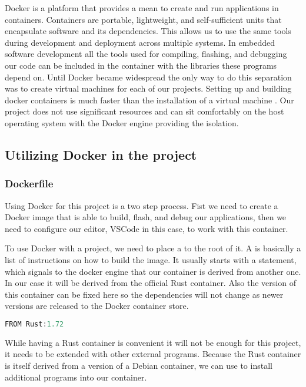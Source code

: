 Docker is a platform that provides a mean to create and run applications in containers. Containers are portable, lightweight, and self-sufficient units that encapsulate software and its dependencies. This allows us to use the same tools during development and deployment across multiple systems. In embedded software development all the tools used for compiling, flashing, and debugging our code can be included in the container with the libraries these programs depend on. Until Docker became widespread the only way to do this separation was to create virtual machines for each of our projects. Setting up and building docker containers is much faster than the installation of a virtual machine \cite{VMVsDocker}. Our project does not use significant resources and can sit comfortably on the host operating system with the Docker engine providing the isolation.

\subsection{Utilizing Docker in the project}

\subsubsection{Dockerfile}

Using Docker for this project is a two step process. Fist we need to create a Docker image that is able to build, flash, and debug our applications, then we need to configure our editor, VSCode in this case, to work with this container.

To use Docker with a project, we need to place a  to the root of it. A  is basically a list of instructions on how to build the image. It usually starts with a  statement, which signals to the docker engine that our container is derived from another one. In our case it will be derived from the official Rust container. Also the version of this container can be fixed here so the dependencies will not change as newer versions are released to the Docker container store.

\begin{lstlisting}[language=C,frame=single,float=!ht,label={lst:from-rust},caption={Deriving from Rust Container}]
    FROM Rust:1.72
\end{lstlisting}

While having a Rust container is convenient it will not be enough for this project, it needs to be extended with other external programs. Because the Rust container is itself derived from a version of a Debian container, we can use  to install additional programs into our container.

